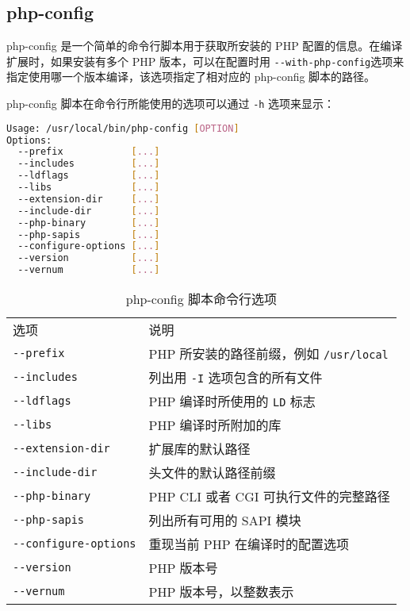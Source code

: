 \subsection{php-config}


php-config 是一个简单的命令行脚本用于获取所安装的 PHP 配置的信息。在编译扩展时，如果安装有多个 PHP 版本，可以在配置时用 \texttt{-\/-with-php-config}选项来指定使用哪一个版本编译，该选项指定了相对应的 php-config 脚本的路径。

php-config 脚本在命令行所能使用的选项可以通过 \texttt{-h} 选项来显示：

\begin{lstlisting}[language=bash]
Usage: /usr/local/bin/php-config [OPTION]
Options:
  --prefix            [...]
  --includes          [...]
  --ldflags           [...]
  --libs              [...]
  --extension-dir     [...]
  --include-dir       [...]
  --php-binary        [...]
  --php-sapis         [...]
  --configure-options [...]
  --version           [...]
  --vernum            [...]
\end{lstlisting}

\begin{table}[htbp]
\centering
\caption{php-config 脚本命令行选项}
\label{PHP_commandline}
\begin{tabular}{ll}
\hline
选项					&说明\\
\texttt{-\/-prefix}			&PHP 所安装的路径前缀，例如 \texttt{/usr/local}\\
\texttt{-\/-includes}		&列出用 \texttt{-I} 选项包含的所有文件\\
\texttt{-\/-ldflags}		&PHP 编译时所使用的 \texttt{LD} 标志\\
\texttt{-\/-libs}			&PHP 编译时所附加的库\\
\texttt{-\/-extension-dir}	&扩展库的默认路径\\
\texttt{-\/-include-dir}	&头文件的默认路径前缀\\
\texttt{-\/-php-binary}	&PHP CLI 或者 CGI 可执行文件的完整路径\\
\texttt{-\/-php-sapis}		&列出所有可用的 SAPI 模块\\
\texttt{-\/-configure-options}	&重现当前 PHP 在编译时的配置选项\\
\texttt{-\/-version}		&PHP 版本号\\
\texttt{-\/-vernum}		&PHP 版本号，以整数表示\\
\end{tabular}
\end{table}



